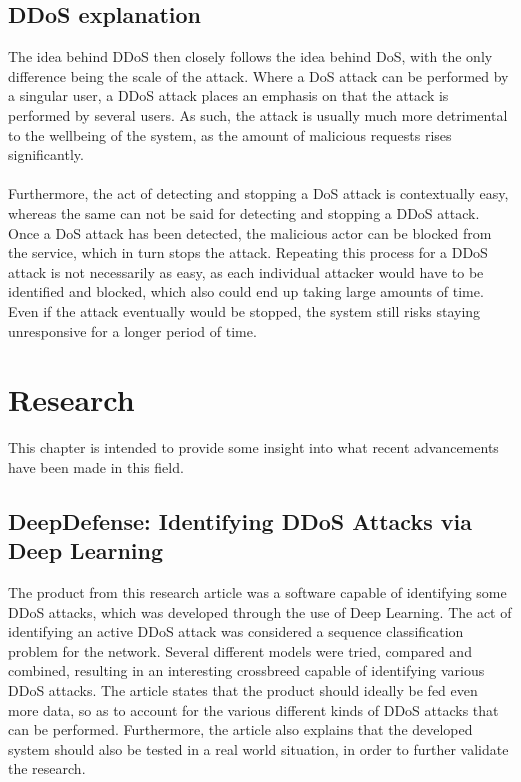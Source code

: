 \documentclass[a4paper, titlepage,12pt]{article}
\begin{document}
	\subsection{DDoS explanation}
		The idea behind DDoS then closely follows the idea behind DoS, with the only difference being the scale of the attack. Where a DoS attack can be performed by a singular user, a DDoS attack places an emphasis on that the attack is performed by several users. As such, the attack is usually much more detrimental to the wellbeing of the system, as the amount of malicious requests rises significantly. 
\\\\
		Furthermore, the act of detecting and stopping a DoS attack is contextually easy, whereas the same can not be said for detecting and stopping a DDoS attack. Once a DoS attack has been detected, the malicious actor can be blocked from the service, which in turn stops the attack. Repeating this process for a DDoS attack is not necessarily as easy, as each individual attacker would have to be identified and blocked, which also could end up taking large amounts of time. Even if the attack eventually would be stopped, the system still risks staying unresponsive for a longer period of time.
	\section{Research}
		This chapter is intended to provide some insight into what recent advancements have been made in this field.
	\subsection{DeepDefense: Identifying DDoS Attacks via Deep Learning
}
		The product from this research article was a software capable of identifying some DDoS attacks, which was developed through the use of Deep Learning. The act of identifying an active DDoS attack was considered a sequence classification problem for the network. Several different models were tried, compared and combined, resulting in an interesting crossbreed capable of identifying various DDoS attacks. The article states that the product should ideally be fed even more data, so as to account for the various different kinds of DDoS attacks that can be performed. Furthermore, the article also explains that the developed system should also be tested in a real world situation, in order to further validate the research. \cite{7946998}
\end{document}

